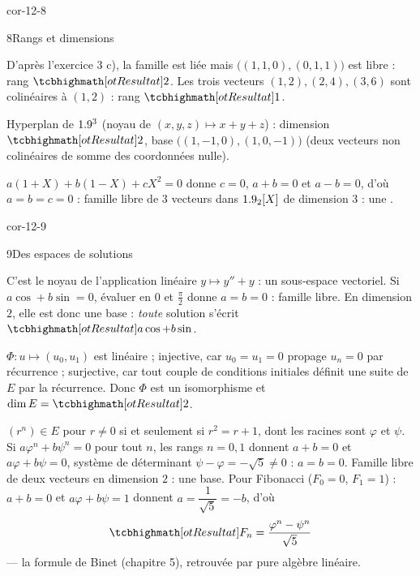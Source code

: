 \begin{blocLivre}{cor-12-8}
\begin{corrige}{8}{Rangs et dimensions}
\begin{questions}
  \item D'après l'exercice 3 c), la famille est liée mais
    $\bigl((1,1,0),(0,1,1)\bigr)$ est libre : rang $\res{2}$. Les trois
    vecteurs $(1,2),(2,4),(3,6)$ sont colinéaires à $(1,2)$ : rang
    $\res{1}$.
  \item Hyperplan de $1.9^{3}$ (noyau de $(x,y,z)\mapsto x+y+z$) :
    dimension $\res{2}$, base $\bigl((1,-1,0),(1,0,-1)\bigr)$ (deux
    vecteurs non colinéaires de somme des coordonnées nulle).
  \item $a(1+X)+b(1-X)+cX^{2}=0$ donne $c=0$, $a+b=0$ et $a-b=0$, d'où
    $a=b=c=0$ : famille libre de $3$ vecteurs dans $1.9_2[X]$ de dimension
    $3$ : une .
\end{questions}
\end{corrige}
\end{blocLivre}

\begin{blocLivre}{cor-12-9}
\begin{corrige}{9}{Des espaces de solutions}
\begin{questions}
  \item C'est le noyau de l'application linéaire $y\mapsto y''+y$ : un
    sous-espace vectoriel. Si $a\cos+b\sin=0$, évaluer en $0$ et
    $\frac{\pi}{2}$ donne $a=b=0$ : famille libre. En dimension $2$, elle
    est donc une base : \emph{toute} solution s'écrit
    $\res{a\cos+b\sin}$.
  \item $\Phi:u\mapsto(u_0,u_1)$ est linéaire ; injective, car $u_0=u_1=0$
    propage $u_n=0$ par récurrence ; surjective, car tout couple de
    conditions initiales définit une suite de $E$ par la récurrence. Donc
    $\Phi$ est un isomorphisme et $\dim E=\res{2}$.
  \item $(r^{n})\in E$ pour $r\neq0$ si et seulement si $r^{2}=r+1$, dont
    les racines sont $\varphi$ et $\psi$. Si
    $a\varphi^{n}+b\psi^{n}=0$ pour tout $n$, les rangs $n=0,1$ donnent
    $a+b=0$ et $a\varphi+b\psi=0$, système de déterminant
    $\psi-\varphi=-\sqrt5\neq0$ : $a=b=0$. Famille libre de deux vecteurs
    en dimension $2$ : une base. Pour Fibonacci ($F_0=0$, $F_1=1$) :
    $a+b=0$ et $a\varphi+b\psi=1$ donnent $a=\dfrac{1}{\sqrt5}=-b$, d'où
    \[
    \res{F_n=\frac{\varphi^{n}-\psi^{n}}{\sqrt5}}
    \]
    — la formule de Binet (chapitre 5), retrouvée par pure algèbre
    linéaire.
\end{questions}
\end{corrige}
\end{blocLivre}

